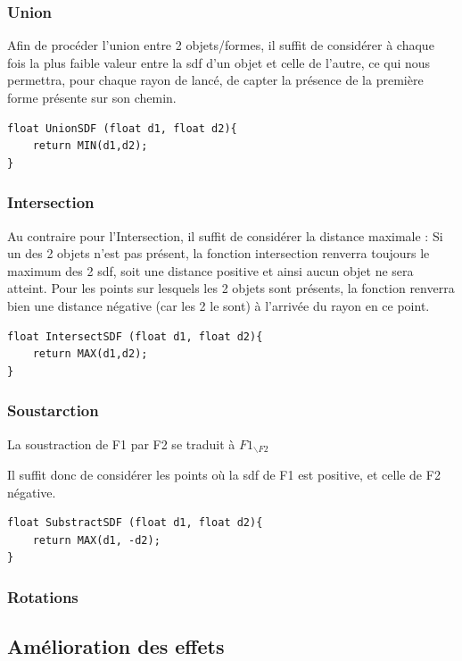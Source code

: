 \documentclass{article}
\begin{document}
\subsubsection{Union}
Afin de procéder l'union entre 2 objets/formes, il suffit de considérer à chaque fois la plus faible 
valeur entre la sdf d'un objet et celle de l'autre, ce qui nous permettra, pour chaque rayon de lancé,
de capter la présence de la première forme présente sur son chemin.

\begin{lstlisting}
float UnionSDF (float d1, float d2){
    return MIN(d1,d2);
}
\end{lstlisting}

\subsubsection{Intersection}
Au contraire pour l'Intersection, il suffit de considérer la distance maximale :
Si un des 2 objets n'est pas présent, la fonction intersection renverra toujours le maximum des 2 sdf,
soit une distance positive et ainsi aucun objet ne sera atteint. Pour les points sur lesquels les 2 objets sont présents,
la fonction renverra bien une distance négative (car les 2 le sont) à l'arrivée du rayon en ce point.

\begin{lstlisting}
float IntersectSDF (float d1, float d2){
    return MAX(d1,d2);
}
\end{lstlisting}

\subsubsection{Soustarction}
La soustraction de F1 par F2 se traduit à $F1_{\backslash F2}$

Il suffit donc de considérer les points où la sdf de F1 est positive, et celle de F2 négative.

\begin{lstlisting}
float SubstractSDF (float d1, float d2){
    return MAX(d1, -d2); 
}
\end{lstlisting}

\subsubsection{Rotations}

\subsection{Amélioration des effets}
\end{document}
